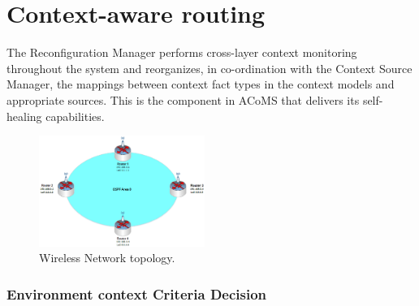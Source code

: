 \section{Context-aware routing}
The Reconfiguration Manager performs cross-layer context monitoring throughout the system and reorganizes, in co-ordination with the Context Source Manager, the mappings between context fact types in the context models and appropriate sources. This is the component in ACoMS that delivers its self-healing capabilities.

\begin{figure}[h]
\centering
\includegraphics[width=0.48\textwidth]{figs/topology.eps}
\caption{Wireless Network topology.}
\label{Fig01}
\end{figure}



\subsubsection{Environment context Criteria Decision}
